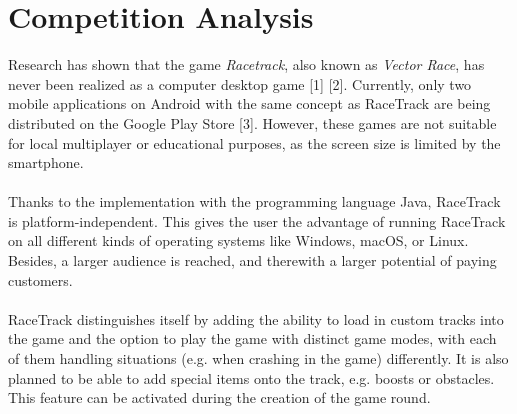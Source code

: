 \section{Competition Analysis}
	Research has shown that the game \textit{Racetrack}, also known as \textit{Vector Race}, has never been realized as a computer desktop game [1] [2]. Currently, only two mobile applications on \gls{Android} with the same concept as RaceTrack are being distributed on the \gls{Google Play Store} [3]. However, these games are not suitable for local multiplayer or educational purposes, as the screen size is limited by the smartphone.
	\\~\\
	Thanks to the implementation with the programming language \gls{Java}, RaceTrack is platform-independent. This gives the user the advantage of running RaceTrack on all different kinds of operating systems like Windows, macOS, or Linux. Besides, a larger audience is reached, and therewith a larger potential of paying customers.
	\\~\\
	RaceTrack distinguishes itself by adding the ability to load in custom tracks into the game and the option to play the game with distinct game modes, with each of them handling situations (e.g. when crashing in the game) differently. It is also planned to be able to add special items onto the track, e.g. boosts or obstacles. This feature can be activated during the creation of the game round.